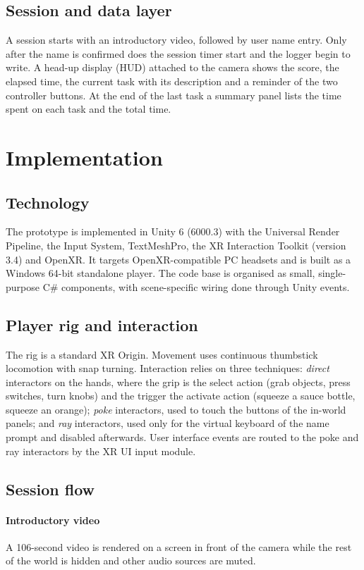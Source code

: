 \documentclass[conference]{IEEEtran}
\begin{document}
\subsection{Session and data layer}
A session starts with an introductory video, followed by user name entry.
Only after the name is confirmed does the session timer start and the logger
begin to write. A head-up display (HUD) attached to the camera shows the
score, the elapsed time, the current task with its description and a reminder
of the two controller buttons. At the end of the last task a summary panel
lists the time spent on each task and the total time.

\section{Implementation}\label{sec:impl}

\subsection{Technology}
The prototype is implemented in Unity 6 (6000.3) with the Universal Render
Pipeline, the Input System, TextMeshPro, the XR Interaction Toolkit
(version 3.4) and OpenXR. It targets OpenXR-compatible PC headsets and is
built as a Windows 64-bit standalone player. The code
base is organised as small, single-purpose C\# components, with
scene-specific wiring done through Unity events.

\subsection{Player rig and interaction}
The rig is a standard XR Origin. Movement uses continuous thumbstick
locomotion with snap turning. Interaction relies on three techniques:
\emph{direct} interactors on the hands, where the grip is the select action
(grab objects, press switches, turn knobs) and the trigger the activate
action (squeeze a sauce bottle, squeeze an orange); \emph{poke} interactors,
used to touch the buttons of the in-world panels; and \emph{ray} interactors,
used only for the virtual keyboard of the name prompt and disabled afterwards.
User interface events are routed to the poke and ray interactors by the
XR UI input module.

\subsection{Session flow}
\paragraph{Introductory video} A 106-second video is rendered on a screen in
front of the camera while the rest of the world is hidden and other audio
sources are muted. 
\end{document}
